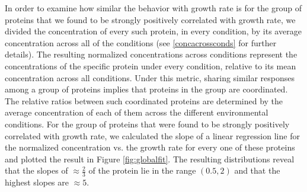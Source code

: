 In order to examine how similar the behavior with growth rate is for the group of proteins that we found to be strongly positively correlated with growth rate, we divided the concentration of every such protein, in every condition, by its average concentration across all of the conditions (see \ref{concacrossconds} for further details).
The resulting normalized concentrations across conditions represent the concentrations of the specific protein under every condition, relative to its mean concentration across all conditions.
Under this metric, sharing similar responses among a group of proteins implies that proteins in the group are coordinated.
The relative ratios between such coordinated proteins are determined by the average concentration of each of them across the different environmental conditions.
For the group of proteins that were found to be strongly positively correlated with growth rate, we calculated the slope of a linear regression line for the normalized concentration vs. the growth rate for every one of these proteins and plotted the result in Figure \ref{fig:globalfit}.
The resulting distributions reveal that the slopes of $\approx \frac{2}{3}$ of the protein lie in the range $(0.5,2)$ and that the highest slopes are $\approx 5$.